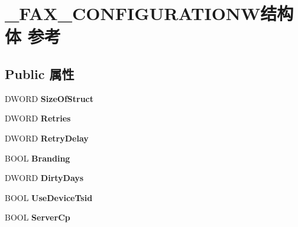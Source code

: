 \hypertarget{struct___f_a_x___c_o_n_f_i_g_u_r_a_t_i_o_n_w}{}\section{\+\_\+\+F\+A\+X\+\_\+\+C\+O\+N\+F\+I\+G\+U\+R\+A\+T\+I\+O\+N\+W结构体 参考}
\label{struct___f_a_x___c_o_n_f_i_g_u_r_a_t_i_o_n_w}
\subsection*{Public 属性}
\begin{DoxyCompactItemize}
\item 
\mbox{\label{struct___f_a_x___c_o_n_f_i_g_u_r_a_t_i_o_n_w_a963792c28b9479792fc1a890254d07b5}} 
D\+W\+O\+RD {\bfseries Size\+Of\+Struct}
\item 
\mbox{\label{struct___f_a_x___c_o_n_f_i_g_u_r_a_t_i_o_n_w_a62aa404a0383bed17b01abe675cc9056}} 
D\+W\+O\+RD {\bfseries Retries}
\item 
\mbox{\label{struct___f_a_x___c_o_n_f_i_g_u_r_a_t_i_o_n_w_a20287b816e18a58dae0c322089b3f4c6}} 
D\+W\+O\+RD {\bfseries Retry\+Delay}
\item 
\mbox{\label{struct___f_a_x___c_o_n_f_i_g_u_r_a_t_i_o_n_w_a154738242bb645725acffa243313c875}} 
B\+O\+OL {\bfseries Branding}
\item 
\mbox{\label{struct___f_a_x___c_o_n_f_i_g_u_r_a_t_i_o_n_w_a8560e644916e22bfb27a62be34ff71c5}} 
D\+W\+O\+RD {\bfseries Dirty\+Days}
\item 
\mbox{\label{struct___f_a_x___c_o_n_f_i_g_u_r_a_t_i_o_n_w_a3704296c7b00b6b6f29d70a0a8e0f103}} 
B\+O\+OL {\bfseries Use\+Device\+Tsid}
\item 
\mbox{\label{struct___f_a_x___c_o_n_f_i_g_u_r_a_t_i_o_n_w_a299e762a4923d80a0ea357b22b864d4c}} 
B\+O\+OL {\bfseries Server\+Cp}

\end{DoxyCompactItemize}
